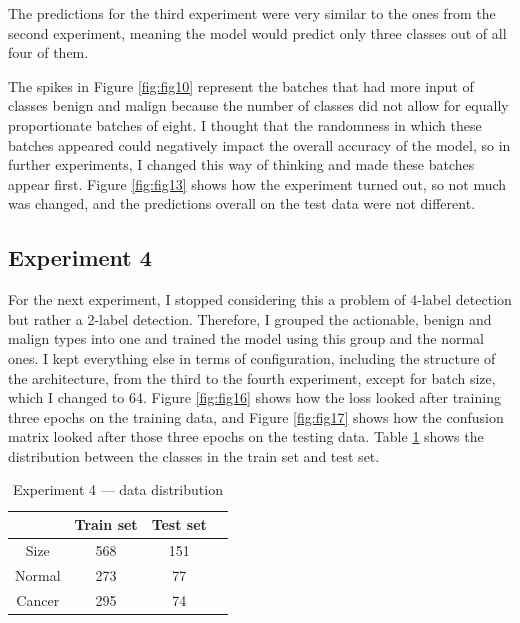 The predictions for the third experiment were very similar to the ones from the second experiment, meaning the model would predict only three classes out of all four of them.

The spikes in Figure \ref{fig:fig10} represent the batches that had more input of classes benign and malign because the number of classes did not allow for equally proportionate batches of eight. I thought that the randomness in which these batches appeared could negatively impact the overall accuracy of the model, so in further experiments, I changed this way of thinking and made these batches appear first. Figure \ref{fig:fig13} shows how the experiment turned out, so not much was changed, and the predictions overall on the test data were not different.

\subsection{Experiment 4}

For the next experiment, I stopped considering this a problem of 4-label detection but rather a 2-label detection. Therefore, I grouped the actionable, benign and malign types into one and trained the model using this group and the normal ones. I kept everything else in terms of configuration, including the structure of the architecture, from the third to the fourth experiment, except for batch size, which I changed to 64. Figure \ref{fig:fig16} shows how the loss looked after training three epochs on the training data, and Figure \ref{fig:fig17} shows how the confusion matrix looked after those three epochs on the testing data. Table \ref{tab:tab2} shows the distribution between the classes in the train set and test set.

\begin{table}[ht!]
\centering
\begin{tabular}{|c|c|c|c|}
    \hline
     & Train set & Test set \\ \hline
    Size & 568 & 151 \\ \hline
    Normal & 273 & 77\\ \hline
    Cancer & 295 & 74\\ \hline
    \end{tabular}
    \caption{Experiment 4 --- data distribution}
    \label{tab:tab2}
\end{table}

